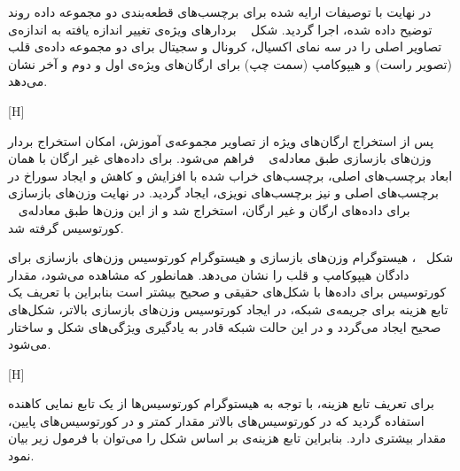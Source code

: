در نهایت با توصیفات ارایه شده برای برچسب‌های قطعه‌بندی دو مجموعه داده روند توضیح داده شده، اجرا گردید. شکل ~ بردارهای ویژه‌ی تغییر اندازه یافته به اندازه‌ی تصاویر اصلی را در سه نمای اکسیال، کرونال و سجیتال برای دو مجموعه داده‌ی قلب (تصویر راست) و هیپوکامپ (سمت چپ) برای ارگان‌های ویژه‌ی اول و دوم و آخر نشان می‌دهد. 

[H]

پس از استخراج ارگان‌های ویژه از تصاویر مجموعه‌ی آموزش، امکان استخراج بردار وزن‌های بازسازی طبق معادله‌ی ~ فراهم می‌شود. برای داده‌های غیر ارگان با همان ابعاد برچسب‌های اصلی، برچسب‌های خراب شده با افزایش و کاهش و ایجاد سوراخ در برچسب‌های اصلی و نیز برچسب‌های نویزی، ایجاد گردید. در نهایت وزن‌های بازسازی برای داده‌های ارگان و غیر ارگان، استخراج شد و از این وزن‌ها طبق معادله‌ی ~ کورتوسیس گرفته شد.
 
 شکل ~، هیستوگرام وزن‌های بازسازی و هیستوگرام کورتوسیس وزن‌های بازسازی برای دادگان هیپوکامپ و قلب را نشان می‌دهد. همانطور که مشاهده می‌شود، مقدار کورتوسیس برای داده‌ها با شکل‌های حقیقی و صحیح بیشتر است بنابراین با تعریف یک تابع هزینه برای جریمه‌ی شبکه، در ایجاد کورتوسیس وزن‌های بازسازی بالاتر، شکل‌های صحیح ایجاد می‌گردد و در این حالت شبکه قادر به یادگیری ویژگی‌های شکل و ساختار می‌شود. 
 
[H]

برای تعریف تابع هزینه، با توجه به هیستوگرام کورتوسیس‌ها از یک تابع نمایی کاهنده استفاده گردید که در کورتوسیس‌های بالاتر مقدار کمتر و در کورتوسیس‌های پایین، مقدار بیشتری دارد. بنابراین تابع هزینه‌ی بر اساس شکل را می‌توان با فرمول زیر بیان نمود.

